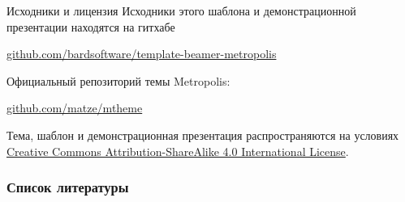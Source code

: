 \documentclass[12pt]{beamer}
\begin{document}
\begin{frame}{Исходники и лицензия}
Исходники этого шаблона и демонстрационной презентации находятся на гитхабе

\begin{center}\url{github.com/bardsoftware/template-beamer-metropolis}\end{center}

Официальный репозиторий темы Metropolis:

\begin{center}\url{github.com/matze/mtheme}\end{center}

Тема, шаблон и демонстрационная презентация распространяются на условиях
\href{http://creativecommons.org/licenses/by-sa/4.0/}{Creative Commons
Attribution-ShareAlike 4.0 International License}.

\begin{center}\ccbysa\end{center}

\end{frame}


\begin{frame}[allowframebreaks]
\frametitle{Список литературы}
\nocite{*}



\end{frame}
\end{document}
